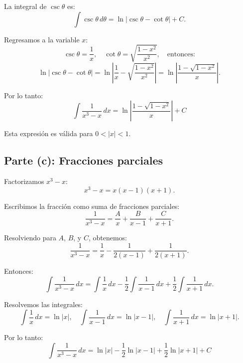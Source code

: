 La integral de \( \csc\theta \) es:
\[
\int \csc\theta \, d\theta = \ln|\csc\theta - \cot\theta| + C.
\]

Regresamos a la variable \( x \):
\[
\csc\theta = \frac{1}{x}, \quad \cot\theta = \sqrt{\frac{1-x^2}{x^2}}, \quad \text{entonces:}
\]
\[
\ln|\csc\theta - \cot\theta| = \ln\left|\frac{1}{x} - \sqrt{\frac{1-x^2}{x^2}}\right| = \ln\left|\frac{1 - \sqrt{1-x^2}}{x}\right|.
\]

Por lo tanto:
\[\boxed{
\int \frac{1}{x^3 - x} \, dx = \ln\left|\frac{1 - \sqrt{1-x^2}}{x}\right| + C}
\]

Esta expresión es válida para \( 0 < |x| < 1 \).

\subsection*{Parte (c): Fracciones parciales}

Factorizamos \( x^3 - x \):
\[
x^3 - x = x(x-1)(x+1).
\]

Escribimos la fracción como suma de fracciones parciales:
\[
\frac{1}{x^3 - x} = \frac{A}{x} + \frac{B}{x-1} + \frac{C}{x+1}.
\]

Resolviendo para \( A \), \( B \), y \( C \), obtenemos:
\[
\frac{1}{x^3 - x} = \frac{1}{x} - \frac{1}{2(x-1)} + \frac{1}{2(x+1)}.
\]

Entonces:
\[
\int \frac{1}{x^3 - x} \, dx = \int \frac{1}{x} \, dx - \frac{1}{2} \int \frac{1}{x-1} \, dx + \frac{1}{2} \int \frac{1}{x+1} \, dx.
\]

Resolvemos las integrales:
\[
\int \frac{1}{x} \, dx = \ln|x|, \quad \int \frac{1}{x-1} \, dx = \ln|x-1|, \quad \int \frac{1}{x+1} \, dx = \ln|x+1|.
\]

Por lo tanto:
\[\boxed{
\int \frac{1}{x^3 - x} \, dx = \ln|x| - \frac{1}{2} \ln|x-1| + \frac{1}{2} \ln|x+1| + C}    
\]
